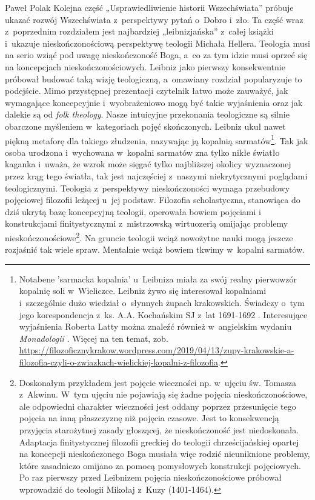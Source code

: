 \begin{recplenv}{Paweł Polak}
Kolejna część „Usprawiedliwienie historii Wszechświata” próbuje ukazać rozwój Wszechświata z~perspektywy pytań o~Dobro i~zło.
Ta część wraz z~poprzednim rozdziałem jest najbardziej „leibnizjańska” z~całej książki i~ukazuje
nieskończonościową perspektywę teologii Michała Hellera. Teologia musi na serio wziąć pod uwagę nieskończoność Boga, a~co
za tym idzie musi oprzeć się na koncepcjach nieskończonościowych. Leibniz jako pierwszy konsekwentnie próbował
budować taką wizję teologiczną, a~omawiany rozdział popularyzuje to podejście. Mimo przystępnej prezentacji czytelnik
łatwo może zauważyć, jak wymagające koncepcyjnie i~wyobrażeniowo mogą być takie wyjaśnienia oraz jak dalekie są od
\textit{folk theology}. Nasze intuicyjne przekonania teologiczne są silnie obarczone
myśleniem w~kategoriach pojęć skończonych. Leibniz ukuł nawet piękną metaforę dla takiego złudzenia, nazywając ją
kopalnią sarmatów\footnote{Notabene 'sarmacka kopalnia' u~Leibniza miała za swój realny pierwowzór kopalnię soli w~Wieliczce.
Leibniz żywo się interesował kopalniami i~szczególnie dużo wiedział o~słynnych żupach krakowskich. Świadczy o~tym
jego korespondencja z~ks. A.A. Kochańskim SJ z~lat 1691-1692
\parencite{kochanski_korespondencja_2005,kochanski_korespondencja_2019}.
Interesujące wyjaśnienia Roberta Latty
można znaleźć również w~angielskim wydaniu \textit{Monadologii}
\parencite[s.~346]{leibniz_monadology_1898}.
Więcej na ten temat, zob.
\url{https://filozoficznykrakow.wordpress.com/2019/04/13/zupy-krakowskie-a-filozofia-czyli-o-zwiazkach-wielickiej-kopalni-z-filozofia}.
}.
Tak jak osoba urodzona i~wychowana w~kopalni sarmatów zna tylko nikłe światło kaganka i~uważa, że wzrok może sięgać
tylko najbliższej okolicy wyznaczonej przez krąg tego światła, tak jest najczęściej z~naszymi niekrytycznymi poglądami
teologicznymi. Teologia z~perspektywy nieskończoności wymaga przebudowy pojęciowej filozofii leżącej u~jej podstaw.
Filozofia scholastyczna, stanowiąca do dziś ukrytą bazę koncepcyjną teologii, operowała bowiem pojęciami i
konstrukcjami finitystycznymi z~mistrzowską wirtuozerią omijając problemy nieskończonościowe\footnote{Doskonałym
przykładem jest pojęcie wieczności np. w~ujęciu św. Tomasza z~Akwinu. W~tym ujęciu nie pojawiają się żadne pojęcia
nieskończonościowe, ale odpowiedni charakter wieczności jest oddany poprzez przesunięcie tego pojęcia na inną
płaszczyznę niż pojęcia czasowe. Jest to konsekwencją przyjęcia starożytnej zasady głoszącej, że nieskończoność jest
niedoskonała. Adaptacja finitystycznej filozofii greckiej do teologii chrześcijańskiej opartej na koncepcji
nieskończonego Boga musiała więc rodzić nieuniknione problemy, które zasadniczo omijano za pomocą pomysłowych
konstrukcji pojęciowych. Po raz pierwszy przed Leibnizem pojęcia nieskończonościowe próbował wprowadzić do teologii
Mikołaj z~Kuzy (1401-1464).}. Na gruncie teologii wciąż nowożytne nauki mogą jeszcze rozjaśnić tak wiele spraw.
Mentalnie wciąż bowiem tkwimy w~kopalni sarmatów.


\end{recplenv}
